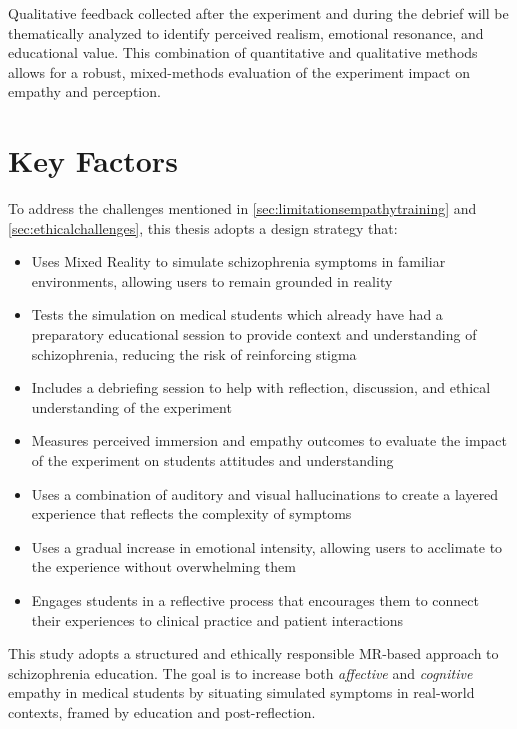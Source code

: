 Qualitative feedback collected after the experiment and during the debrief will be thematically analyzed to identify perceived realism, emotional resonance, and educational value. This combination of quantitative and qualitative methods allows for a robust, mixed-methods evaluation of the experiment impact on empathy and perception.

\vspace{1em}

\section{Key Factors}
To address the challenges mentioned in \ref{sec:limitationsempathytraining} and \ref{sec:ethicalchallenges}, this thesis adopts a design strategy that:

\begin{itemize}
    \item Uses Mixed Reality to simulate schizophrenia symptoms in familiar environments, allowing users to remain grounded in reality
    \item Tests the simulation on medical students which already have had a preparatory educational session to provide context and understanding of schizophrenia, reducing the risk of reinforcing stigma
    \item Includes a debriefing session to help with reflection, discussion, and ethical understanding of the experiment
    \item Measures perceived immersion and empathy outcomes to evaluate the impact of the experiment on students attitudes and understanding
    \item Uses a combination of auditory and visual hallucinations to create a layered experience that reflects the complexity of symptoms
    \item Uses a gradual increase in emotional intensity, allowing users to acclimate to the experience without overwhelming them
    \item Engages students in a reflective process that encourages them to connect their experiences to clinical practice and patient interactions
\end{itemize}

This study adopts a structured and ethically responsible MR-based approach to schizophrenia education. The goal is to increase both \textit{affective} and \textit{cognitive} empathy in medical students by situating simulated symptoms in real-world contexts, framed by education and post-reflection. 

